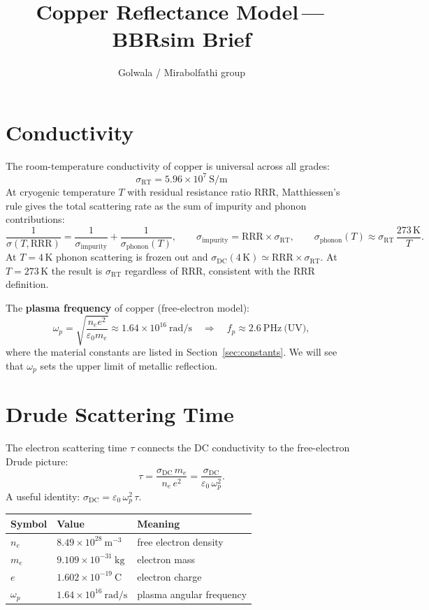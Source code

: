 \documentclass[11pt]{article}
\title{\textbf{Copper Reflectance Model\,---\,BBRsim Brief}}
\author{Golwala / Mirabolfathi group}
\date{}
\begin{document}
\maketitle

\tableofcontents
\bigskip

\section{Conductivity}

The room-temperature conductivity of copper is universal across all grades:
\[
  \sigma_\mathrm{RT} = 5.96\times10^{7}\ \mathrm{S/m}
\]
At cryogenic temperature $T$ with residual resistance ratio $\mathrm{RRR}$,
Matthiessen's rule gives the total scattering rate as the sum of
impurity and phonon contributions:
\[
  \frac{1}{\sigma(T,\mathrm{RRR})}
  = \frac{1}{\sigma_\mathrm{impurity}} + \frac{1}{\sigma_\mathrm{phonon}(T)},
  \qquad
  \sigma_\mathrm{impurity} = \mathrm{RRR}\times\sigma_\mathrm{RT},
  \qquad
  \sigma_\mathrm{phonon}(T) \approx \sigma_\mathrm{RT}\,\frac{273\,\mathrm{K}}{T}.
\]
At $T = 4\,\mathrm{K}$ phonon scattering is frozen out and
$\sigma_\mathrm{DC}(4\,\mathrm{K}) \simeq \mathrm{RRR}\times\sigma_\mathrm{RT}$.
At $T = 273\,\mathrm{K}$ the result is $\sigma_\mathrm{RT}$ regardless of RRR,
consistent with the RRR definition.

\medskip
The \textbf{plasma frequency} of copper (free-electron model):
\[
  \omega_p = \sqrt{\frac{n_e e^2}{\varepsilon_0 m_e}}
  \approx 1.64\times10^{16}\ \mathrm{rad/s}
  \quad\Longrightarrow\quad
  f_p \approx 2.6\ \mathrm{PHz}\ \text{(UV)},
\]
where the material constants are listed in Section~\ref{sec:constants}.
We will see that $\omega_p$ sets the upper limit of metallic reflection.

\section{Drude Scattering Time}

The electron scattering time $\tau$ connects the DC conductivity to the
free-electron Drude picture:
\[
  \tau = \frac{\sigma_\mathrm{DC}\, m_e}{n_e\, e^2}
       = \frac{\sigma_\mathrm{DC}}{\varepsilon_0\,\omega_p^2}.
\]
A useful identity: $\sigma_\mathrm{DC} = \varepsilon_0\,\omega_p^2\,\tau$.

\begin{center}
\begin{tabular}{@{}lll@{}}
\toprule
Symbol & Value & Meaning \\
\midrule
$n_e$ & $8.49\times10^{28}\ \mathrm{m}^{-3}$ & free electron density \\
$m_e$ & $9.109\times10^{-31}\ \mathrm{kg}$   & electron mass \\
$e$   & $1.602\times10^{-19}\ \mathrm{C}$    & electron charge \\
$\omega_p$ & $1.64\times10^{16}\ \mathrm{rad/s}$ & plasma angular frequency \\
\bottomrule
\end{tabular}
\end{center}
\end{document}

